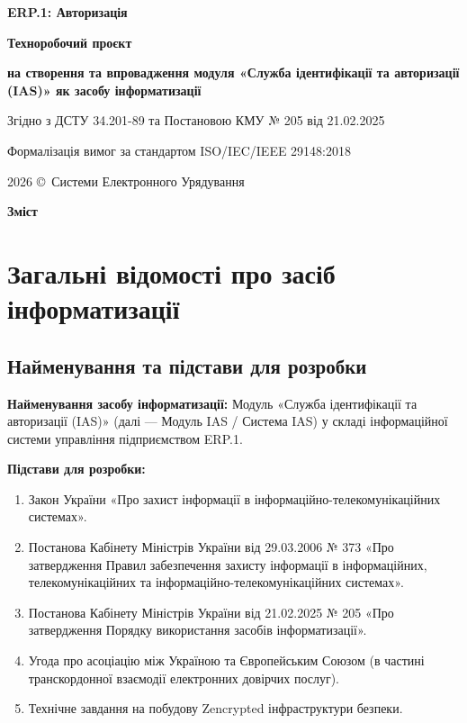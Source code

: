 \documentclass{article}
\newcommand\HUGE[1]{\fontsize{40}{40}\selectfont #1}
\begin{document}
\pagestyle{fancy}

\begin{titlepage}
  \AddToShipoutPictureBG*{\AtPageLowerLeft{\color{nato}\rule{\paperwidth}{\paperheight}}}
  \color{white}\thispagestyle{empty}\vspace*{3cm}\centering
  {\Huge  \textbf{ERP.1: Авторизація} \par} \vspace{1.5cm}
  {\HUGE  \textbf{Техноробочий проєкт} \par} \vspace{1.5cm}
  {\LARGE \textbf{на створення та впровадження модуля «Служба ідентифікації та авторизації (IAS)» як засобу інформатизації} \par} \vspace{1.5cm}
  {\large Згідно з ДСТУ 34.201-89 та Постановою КМУ № 205 від 21.02.2025 \par}
  {\large Формалізація вимог за стандартом ISO/IEC/IEEE 29148:2018 \par}
  \vfill
  {\large 2026 \copyright\ Системи Електронного Урядування \par}
\end{titlepage}

\newpage

\begin{center}
  {\Huge\color{nato}\bfseries Зміст\par}
\end{center}
\vspace{40pt}
\tableofcontents

\newpage

\section{Загальні відомості про засіб інформатизації}

\subsection{Найменування та підстави для розробки}
\textbf{Найменування засобу інформатизації:} Модуль «Служба ідентифікації та авторизації (IAS)» (далі --- Модуль IAS / Система IAS) у складі інформаційної системи управління підприємством ERP.1.

\textbf{Підстави для розробки:}
\begin{enumerate}
    \item Закон України «Про захист інформації в інформаційно-телекомунікаційних системах».
    \item Постанова Кабінету Міністрів України від 29.03.2006 № 373 «Про затвердження Правил забезпечення захисту інформації в інформаційних, телекомунікаційних та інформаційно-телекомунікаційних системах».
    \item Постанова Кабінету Міністрів України від 21.02.2025 № 205 «Про затвердження Порядку використання засобів інформатизації».
    \item Угода про асоціацію між Україною та Європейським Союзом (в частині транскордонної взаємодії електронних довірчих послуг).
    \item Технічне завдання на побудову Zencrypted інфраструктури безпеки.
\end{enumerate}
\end{document}
